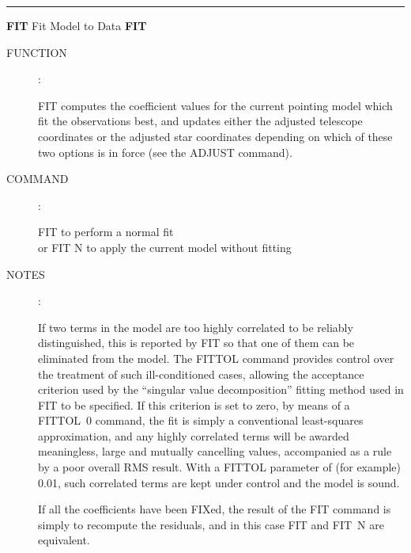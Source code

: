 \goodbreak
\rule{\textwidth}{0.3mm}
{\Large {\bf FIT} \hfill Fit Model to Data \hfill {\bf FIT}}
\begin{description}
\item [FUNCTION]:

FIT computes the coefficient values for the current
pointing model which fit the observations best, and updates
either the adjusted telescope coordinates or the adjusted star
coordinates depending on which of these two options is in force
(see the ADJUST command).

\item [COMMAND]:

\begin{cmd}
\> \> FIT \> to perform a normal fit \\
\> or \> FIT N \> to apply the current model without fitting
\end{cmd}

\item [NOTES]:

If two terms in the model are too highly correlated to be reliably
distinguished, this is reported by FIT so that one of
them can be eliminated from the model.  The FITTOL command provides
control over the treatment of such ill-conditioned cases, allowing
the acceptance criterion used by the ``singular value decomposition''
fitting method used in FIT to be specified.  If this criterion is
set to zero, by means of a FITTOL~0 command, the fit is simply a
conventional least-squares approximation, and any highly correlated
terms will be awarded meaningless, large and mutually cancelling
values, accompanied as a rule by a poor overall RMS result.  With
a FITTOL parameter of (for example) 0.01, such correlated terms
are kept under control and the model is sound.

If all the coefficients have been FIXed, the result of the FIT
command is simply to recompute the residuals, and in this case
FIT and FIT~N are equivalent.

\end{description}


